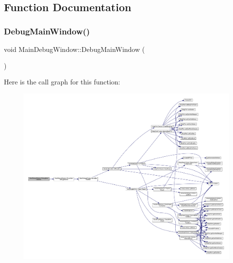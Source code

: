 \subsection{Function Documentation}
\mbox{\label{namespace_main_debug_window_ae86fa1cdeae81822f5567320f9d56f65}} 
\subsubsection{\texorpdfstring{Debug\+Main\+Window()}{DebugMainWindow()}}
{\footnotesize\ttfamily void Main\+Debug\+Window\+::\+Debug\+Main\+Window (\begin{DoxyParamCaption}{ }\end{DoxyParamCaption})}

Here is the call graph for this function\+:
\nopagebreak
\begin{figure}[H]
\begin{center}
\leavevmode
\includegraphics[width=350pt]{d9/dd7/namespace_main_debug_window_ae86fa1cdeae81822f5567320f9d56f65_cgraph}
\end{center}
\end{figure}
\mbox{\label{namespace_main_debug_window_a2c9084a9752a2e4ef87b8ca3039f5a4d}} 
